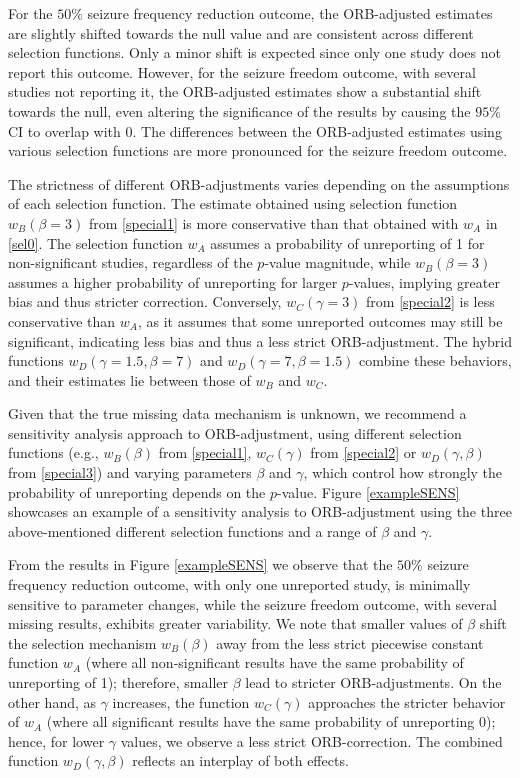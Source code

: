 \documentclass[twocolumn]{article}\usepackage[]{graphicx}\usepackage[]{xcolor}
\begin{document}
For the $50\%$ seizure frequency reduction outcome, the ORB-adjusted estimates are slightly shifted towards the null value and are consistent across different selection functions. Only a minor shift is expected since only one study does not report this outcome. However, for the seizure freedom outcome, with several studies not reporting it, the ORB-adjusted estimates show a substantial shift towards the null, even altering the significance of the results by causing the $95\%$ CI to overlap with 0. The differences between the ORB-adjusted estimates using various selection functions are more pronounced for the seizure freedom outcome.

The strictness of different ORB-adjustments varies depending on the assumptions of each selection function. The estimate obtained using selection function $w_B(\beta=3)$ from \eqref{special1} is more conservative than that obtained with $w_A$ in \eqref{sel0}. The selection function $w_A$ assumes a probability of unreporting of 1 for non-significant studies, regardless of the $p$-value magnitude, while $w_B(\beta=3)$ assumes a higher probability of unreporting for larger $p$-values, implying greater bias and thus stricter correction. Conversely, $w_C(\gamma=3)$ from \eqref{special2} is less conservative than $w_A$, as it assumes that some unreported outcomes may still be significant, indicating less bias and thus a less strict ORB-adjustment. The hybrid functions $w_D(\gamma=1.5,\beta=7)$ and $w_D(\gamma=7,\beta=1.5)$ combine these behaviors, and their estimates lie between those of $w_B$ and $w_C$.

Given that the true missing data mechanism is unknown, we recommend a sensitivity analysis approach to ORB-adjustment, using different selection functions (e.g., $w_B(\beta)$ from \eqref{special1}, $w_C(\gamma)$ from \eqref{special2} or $w_D(\gamma, \beta)$ from \eqref{special3}) and varying parameters $\beta$ and $\gamma$, which control how strongly the probability of unreporting depends on the $p$-value. Figure \ref{exampleSENS} showcases an example of a sensitivity analysis to ORB-adjustment using the three above-mentioned different selection functions and a range of $\beta$ and $\gamma$.

From the results in Figure \ref{exampleSENS} we observe that the $50\%$ seizure frequency reduction outcome, with only one unreported study, is minimally sensitive to parameter changes, while the seizure freedom outcome, with several missing results, exhibits greater variability. We note that smaller values of $\beta$ shift the selection mechanism $w_B(\beta)$ away from the less strict piecewise constant function $w_A$ (where all non-significant results have the same probability of unreporting of 1); therefore, smaller $\beta$ lead to stricter ORB-adjustments. On the other hand, as $\gamma$ increases, the function $w_C(\gamma)$ approaches the stricter behavior of $w_A$ (where all significant results have the same probability of unreporting 0); hence, for lower $\gamma$ values, we observe a less strict ORB-correction. The combined function $w_D(\gamma, \beta)$ reflects an interplay of both effects.
\end{document}
